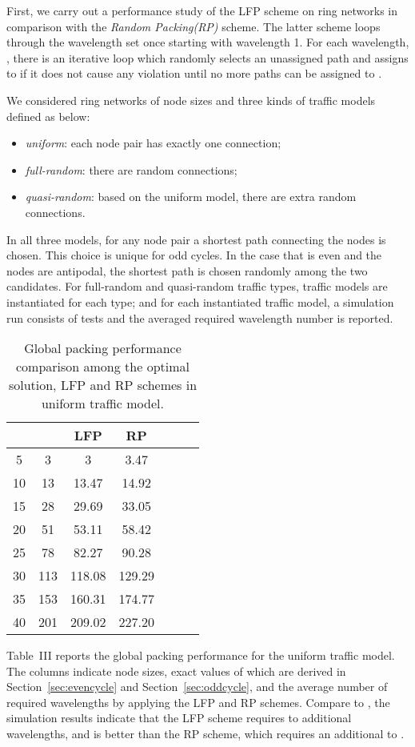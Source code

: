 \documentclass[journal,draftcls,onecolumn,12pt,twoside]{IEEEtran}
\begin{document}
First, we carry out a performance study of the LFP scheme on ring networks in comparison
with the \emph{Random Packing(RP)} scheme.  The latter scheme loops through
the wavelength set once starting with wavelength 1.  For each wavelength, , there
is an iterative loop which randomly selects an unassigned path and assigns to  if it does not cause any violation until no more paths can be assigned to .

We considered ring networks of node sizes  and three kinds of traffic models defined as below:
\begin{itemize}
\item \emph{uniform}: each node pair has exactly one connection;
\item \emph{full-random}: there are  random connections;
\item \emph{quasi-random}: based on the uniform model, there are  extra random connections.
\end{itemize}
In all three models, for any node pair a shortest path connecting the nodes is chosen.
This choice is unique for odd cycles.  In the case that  is even and the nodes are antipodal,
the shortest path is chosen randomly among the two candidates. 
For full-random and quasi-random traffic types,  traffic models are instantiated for each
type; and for each instantiated traffic model, a simulation run consists of  tests 
and the averaged required wavelength number is reported.

\begin{table}[h]\label{tab:uniform}
\begin{tabular}{|c||c|c|c|c|c|c|}
\hline
 &  & LFP & RP \\ \hline \hline 
5 & 3 & 3 & 3.47 \\ \hline
10  & 13 & 13.47 & 14.92 \\ \hline
15 & 28 & 29.69 &  33.05 \\ \hline
20 & 51 & 53.11 & 58.42 \\ \hline
25 & 78 & 82.27 & 90.28 \\ \hline
30 & 113 & 118.08 & 129.29 \\ \hline
35 & 153 & 160.31 & 174.77 \\ \hline
40 & 201 & 209.02 & 227.20 \\ \hline
\end{tabular}
\caption{Global packing performance comparison among the optimal solution, LFP and RP schemes in uniform traffic model.}
\end{table}

Table~III reports the global packing performance for the uniform traffic model.
The columns indicate node sizes, exact values of  which are derived in Section~\ref{sec:evencycle} and Section~\ref{sec:oddcycle}, and the average number of required wavelengths by applying the LFP and RP schemes.
Compare to , the simulation results indicate that the LFP scheme requires
 to  additional wavelengths, and is better than the RP scheme, which requires
an additional  to .
\end{document}
